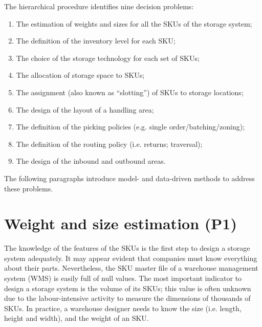 The hierarchical procedure identifies nine decision problems:
\begin{enumerate}
    \item The estimation of weights and sizes for all the SKUs of the storage system;
    \item The definition of the inventory level for each SKU;
    \item The choice of the storage technology for each set of SKUs;
    \item The allocation of storage space to SKUs;
    \item The assignment (also known as “slotting”) of SKUs to storage locations;
    \item The design of the layout of a handling area;
    \item The definition of the picking policies (e.g. single order/batching/zoning);
    \item The definition of the routing policy (i.e. returns; traversal);
    \item The design of the inbound and outbound areas.

\end{enumerate}

The following paragraphs introduce model- and data-driven methods to address these problems.

\section{Weight and size estimation (P1)}
The knowledge of the features of the SKUs is the first step to design a storage system adequately. It may appear evident that companies must know everything about their parts. Nevertheless, the SKU master file of a warehouse management system (WMS) is easily full of null values. The most important indicator to design a storage system is the volume of its SKUs; this value is often unknown due to the labour-intensive activity to measure the dimensions of thousands of SKUs. In practice, a warehouse designer needs to know the size (i.e. length, height and width), and the weight of an SKU.

